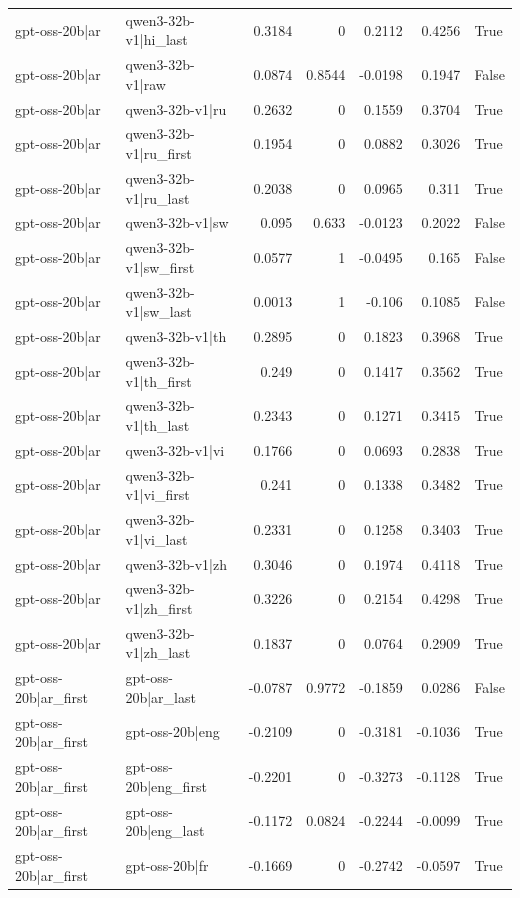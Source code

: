 \begin{table}
\begin{tabular}{l l r r r r l}
gpt-oss-20b|ar & qwen3-32b-v1|hi_last & 0.3184 & 0 & 0.2112 & 0.4256 & True \\
gpt-oss-20b|ar & qwen3-32b-v1|raw & 0.0874 & 0.8544 & -0.0198 & 0.1947 & False \\
gpt-oss-20b|ar & qwen3-32b-v1|ru & 0.2632 & 0 & 0.1559 & 0.3704 & True \\
gpt-oss-20b|ar & qwen3-32b-v1|ru_first & 0.1954 & 0 & 0.0882 & 0.3026 & True \\
gpt-oss-20b|ar & qwen3-32b-v1|ru_last & 0.2038 & 0 & 0.0965 & 0.311 & True \\
gpt-oss-20b|ar & qwen3-32b-v1|sw & 0.095 & 0.633 & -0.0123 & 0.2022 & False \\
gpt-oss-20b|ar & qwen3-32b-v1|sw_first & 0.0577 & 1 & -0.0495 & 0.165 & False \\
gpt-oss-20b|ar & qwen3-32b-v1|sw_last & 0.0013 & 1 & -0.106 & 0.1085 & False \\
gpt-oss-20b|ar & qwen3-32b-v1|th & 0.2895 & 0 & 0.1823 & 0.3968 & True \\
gpt-oss-20b|ar & qwen3-32b-v1|th_first & 0.249 & 0 & 0.1417 & 0.3562 & True \\
gpt-oss-20b|ar & qwen3-32b-v1|th_last & 0.2343 & 0 & 0.1271 & 0.3415 & True \\
gpt-oss-20b|ar & qwen3-32b-v1|vi & 0.1766 & 0 & 0.0693 & 0.2838 & True \\
gpt-oss-20b|ar & qwen3-32b-v1|vi_first & 0.241 & 0 & 0.1338 & 0.3482 & True \\
gpt-oss-20b|ar & qwen3-32b-v1|vi_last & 0.2331 & 0 & 0.1258 & 0.3403 & True \\
gpt-oss-20b|ar & qwen3-32b-v1|zh & 0.3046 & 0 & 0.1974 & 0.4118 & True \\
gpt-oss-20b|ar & qwen3-32b-v1|zh_first & 0.3226 & 0 & 0.2154 & 0.4298 & True \\
gpt-oss-20b|ar & qwen3-32b-v1|zh_last & 0.1837 & 0 & 0.0764 & 0.2909 & True \\
gpt-oss-20b|ar_first & gpt-oss-20b|ar_last & -0.0787 & 0.9772 & -0.1859 & 0.0286 & False \\
gpt-oss-20b|ar_first & gpt-oss-20b|eng & -0.2109 & 0 & -0.3181 & -0.1036 & True \\
gpt-oss-20b|ar_first & gpt-oss-20b|eng_first & -0.2201 & 0 & -0.3273 & -0.1128 & True \\
gpt-oss-20b|ar_first & gpt-oss-20b|eng_last & -0.1172 & 0.0824 & -0.2244 & -0.0099 & True \\
gpt-oss-20b|ar_first & gpt-oss-20b|fr & -0.1669 & 0 & -0.2742 & -0.0597 & True \\

\end{tabular}
\end{table}
